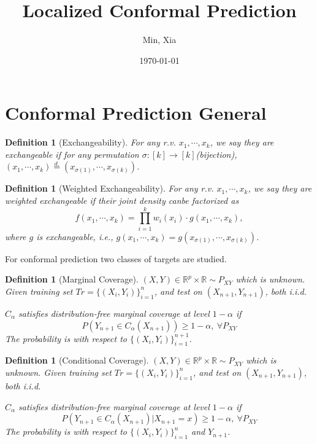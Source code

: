 \documentclass[12pt, a4paper, oneside]{article}
\title{\textbf{Localized Conformal Prediction}}
\author{Min, Xia}
\date{\today}
\newtheorem{definition}[theorem]{Definition}
\begin{document}
\maketitle
\setcounter{page}{1}
\section[Section title sans citation]{Conformal Prediction General\cite{angelopoulos2023conformal}}
    \begin{definition}[Exchangeability]\cite{shafer2008tutorial}
        For any r.v. $x_1,\cdots,x_k$, we say they are exchangeable if for any permutation $\sigma:[k]\rightarrow[k]$(bijection), $(x_1,\cdots,x_k)\overset{d.}{=}(x_{\sigma(1)},\cdots,x_{\sigma(k)})$.
    \end{definition}


    \begin{definition}[Weighted Exchangeability]\cite{tibshirani2019conformal}
        For any r.v. $x_1,\cdots,x_k$, we say they are weighted exchangeable if their joint density canbe factorized as
        \begin{equation*}
            f(x_1,\cdots,x_k)=\overset{k}{\underset{i=1}{\prod}}w_i(x_i)\cdot g(x_1,\cdots,x_k),
        \end{equation*}
        where $g$ is exchangeable, i.e., $g(x_1,\cdots,x_k)=g(x_{\sigma(1)},\cdots,x_{\sigma(k)})$.
    \end{definition}


    For conformal prediction two classes of targets are studied.
    \begin{definition}[Marginal Coverage]
        $(X,Y)\in\mathbb{R}^p\times\mathbb{R}\sim P_{XY}$ which is unknown. Given training set $Tr=\{(X_i,Y_i)\}_{i=1}^n$, and test on $(X_{n+1},Y_{n+1})$, both i.i.d.


        $C_\alpha$  satisfies distribution-free marginal coverage at level $1-\alpha$ if
        \begin{equation*}
            P(Y_{n+1}\in C_\alpha(X_{n+1}))\geq 1-\alpha,\ \forall P_{XY}
        \end{equation*}
        The probability is with respect to $\{(X_i,Y_i)\}_{i=1}^{n+1}$.
    \end{definition}


    \begin{definition}[Conditional Coverage]
        $(X,Y)\in\mathbb{R}^p\times\mathbb{R}\sim P_{XY}$ which is unknown. Given training set $Tr=\{(X_i,Y_i)\}_{i=1}^n$, and test on $(X_{n+1},Y_{n+1})$, both i.i.d.


        $C_\alpha$  satisfies distribution-free marginal coverage at level $1-\alpha$ if
        \begin{equation*}
            P\left( Y_{n+1}\in C_\alpha(X_{n+1})\Big|X_{n+1}=x \right)\geq 1-\alpha,\ \forall P_{XY}
        \end{equation*}
        The probability is with respect to $\{(X_i,Y_i)\}_{i=1}^n$ and $Y_{n+1}$.
    \end{definition}
\end{document}
